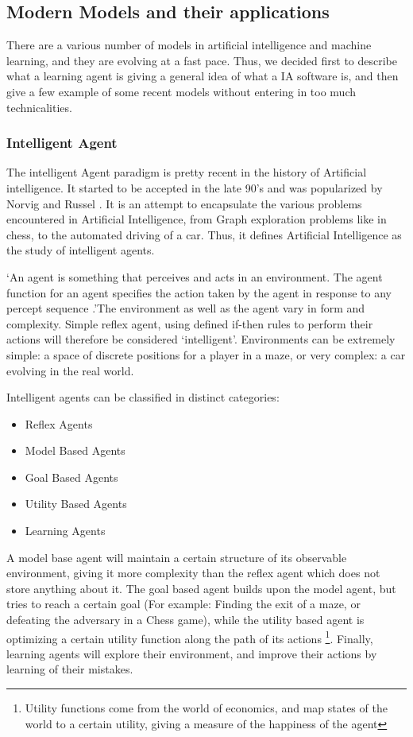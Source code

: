 \documentclass[12pt]{article}
\begin{document}
\pagebreak

\subsection{Modern Models and their applications}

There are a various number of models in artificial intelligence and machine learning,
and they are evolving at a fast pace. Thus, we decided first to describe what a learning
agent is giving a general idea of what a IA software is, and then give a few
example of some recent models without entering in too much technicalities.

\subsubsection{Intelligent Agent}

The intelligent Agent paradigm is pretty recent in the history of Artificial
intelligence. It started to be accepted in the late 90's and was popularized by
Norvig and Russel \cite{RusselAI}. It is an attempt to encapsulate the various
problems encountered in Artificial Intelligence, from Graph exploration problems
like in chess, to the automated driving of a car. Thus, it defines Artificial
Intelligence as the study of intelligent agents.

 \lq An agent is something that perceives and acts in an environment. The agent
function for an agent specifies the action taken by the agent in response to
any percept sequence \cite{RusselAI} .\rq The environment as well as the agent
vary in form and complexity. Simple reflex agent, using defined if-then rules to
perform their actions will therefore be considered \lq intelligent\rq. Environments
can be extremely simple: a space of discrete positions for a player in a maze,
or very complex: a car evolving in the real world.

Intelligent agents can be classified in distinct categories:

\begin{itemize}
  \item Reflex Agents
  \item Model Based Agents
  \item Goal Based Agents
  \item Utility Based Agents
  \item Learning Agents
\end{itemize}

A model base agent will maintain a certain structure of its observable
environment, giving it more complexity than the reflex agent which does not
store anything about it. The goal based agent builds upon the model agent, but
tries to reach a certain goal (For example: Finding the exit of a maze, or
defeating the adversary in a Chess game), while the utility based agent is
optimizing a certain utility function along the path of its actions
\footnote{Utility functions come from the world of economics, and map states of
the world to a certain utility, giving a measure of the happiness of the agent}.
Finally, learning agents will explore their environment, and improve their
actions  by learning of their mistakes.
\end{document}
